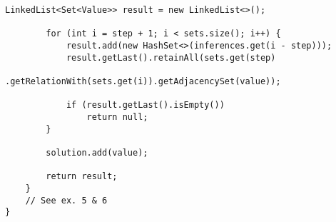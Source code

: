 \begin{lstlisting}[caption=Solver.java, label=lst:solver]
        LinkedList<Set<Value>> result = new LinkedList<>();

        for (int i = step + 1; i < sets.size(); i++) {
            result.add(new HashSet<>(inferences.get(i - step)));
            result.getLast().retainAll(sets.get(step)
                    .getRelationWith(sets.get(i)).getAdjacencySet(value));

            if (result.getLast().isEmpty())
                return null;
        }

        solution.add(value);

        return result;
    }
    // See ex. 5 & 6
}
\end{lstlisting}
\egroup
